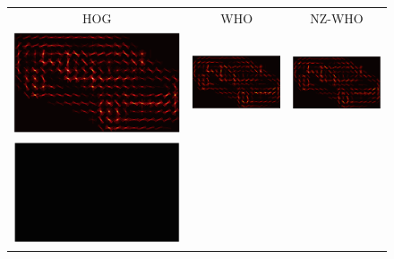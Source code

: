 \documentclass[10pt,twocolumn,letterpaper]{article}
\begin{document}


\begin{figure}[t]
  \begin{center}
    \setlength\tabcolsep{3pt}
    \begin{tabular}{ccc}
      HOG & WHO & NZ-WHO \\
    \includegraphics[width=0.28\linewidth]{hog_crop} &
    \includegraphics[width=0.28\linewidth]{whiten_all_crop} &
    \includegraphics[width=0.28\linewidth]{whiten_non_zero_crop} \\
     \includegraphics[width=0.28\linewidth]{hog_neg_crop} &

\end{tabular}
\end{center}
\end{figure}
\end{document}
